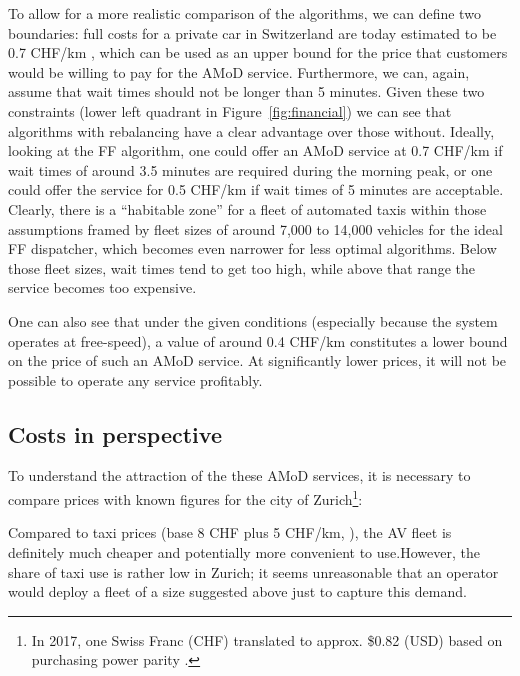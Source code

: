 To allow for a more realistic comparison of the algorithms, we can define two boundaries: full costs for a private car in Switzerland are today estimated to be 0.7 CHF/km \citep{TCS2016}, which can be used as an upper bound for the price that customers would be willing to pay for the AMoD service. Furthermore, we can, again, assume that wait times should not be longer than 5 minutes. Given these two constraints (lower left quadrant in Figure~\ref{fig:financial}) we can see that algorithms with rebalancing have a clear advantage over those without. Ideally, looking at the FF algorithm, one could offer an AMoD service at 0.7 CHF/km if wait times of around 3.5 minutes are required during the morning peak, or one could offer the service for 0.5 CHF/km if wait times of 5 minutes are acceptable. Clearly, there is a  ``habitable zone'' for a fleet of automated taxis within those assumptions framed by fleet sizes of around 7,000 to 14,000 vehicles for the ideal FF dispatcher, which becomes even narrower for less optimal algorithms. Below those fleet sizes, wait times tend to get too high, while above that range the service becomes too expensive.


One can also see that under the given conditions (especially because the system operates at free-speed), a value of around 0.4 CHF/km constitutes a lower bound on the price of such an AMoD service. At significantly lower prices, it will not be possible to operate any service profitably.


\subsection{Costs in perspective}

To understand the attraction of the these AMoD services, it is necessary to compare prices with known figures for the city of Zurich\footnote{In 2017, one Swiss Franc (CHF) translated to approx. \$0.82 (USD) based on purchasing power parity  \citep{OECD2018}.}:

Compared to taxi prices (base 8 CHF plus 5 CHF/km, \citet{StadtZurich2014}), the AV fleet is definitely much cheaper and potentially more convenient to use.However, the share of taxi use is rather low in Zurich; it seems unreasonable that an operator would deploy a fleet of a size suggested above just to capture this demand.


